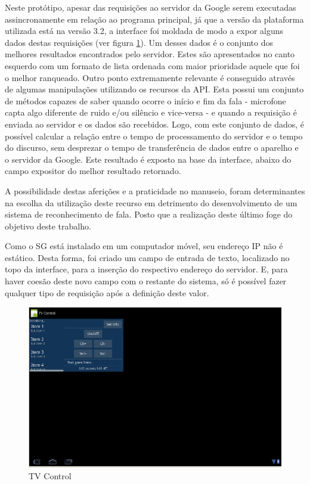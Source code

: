 \documentclass[12pt,a4paper,oneside]{report}
\begin{document}
Neste protótipo, apesar das requisições ao servidor da Google serem executadas assincronamente em relação ao programa principal, já que a versão da plataforma utilizada está na versão 3.2, a interface foi moldada de modo a expor alguns dados destas requisições (ver figura \ref{fig:tv-control}). Um desses dados é o conjunto dos melhores resultados encontrados pelo servidor. Estes são apresentados no canto esquerdo com um formato de lista ordenada com maior prioridade aquele que foi o melhor ranqueado. Outro ponto extremamente relevante é conseguido através de algumas manipulações utilizando os recursos da API. Esta possui um conjunto de métodos capazes de saber quando ocorre o início e fim da fala - microfone capta algo diferente de ruido e/ou silêncio e vice-versa - e quando a requisição é enviada ao servidor e os dados são recebidos. Logo, com este conjunto de dados, é possível calcular a relação entre o tempo de processamento do servidor e o tempo do discurso, sem desprezar o tempo de transferência de dados entre o aparelho e o servidor da Google. Este resultado é exposto na base da interface, abaixo do campo expositor do melhor resultado retornado.

A possibilidade destas aferições e a praticidade no manuseio, foram determinantes na escolha da utilização deste recurso em detrimento do desenvolvimento de um sistema de reconhecimento de fala. Posto que a realização deste último foge do objetivo deste trabalho.

Como o SG está instalado em um computador móvel, seu endereço IP não é estático. Desta forma, foi criado um campo de entrada de texto, localizado no topo da interface, para a inserção do respectivo endereço do servidor. E, para haver coesão deste novo campo com o restante do sistema, só é possível fazer qualquer tipo de requisição após a definição deste valor.

\begin{figure}[htbp]
   \centering
    \includegraphics[width=1\textwidth]{figuras/tv_control}
    \caption{TV Control}
    \label{fig:tv-control}
\end{figure}
\end{document}
